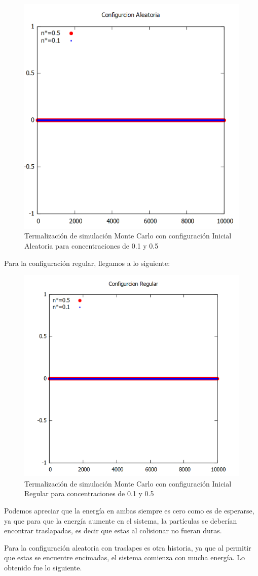 \documentclass[12pt,letterpaper]{article}
\begin{document}
\begin{figure}[H]
	\centering
	\includegraphics[width=0.5\linewidth]{aleatoria.png}
	\caption{Termalización  de simulación Monte Carlo con configuración Inicial Aleatoria para concentraciones de 0.1 y 0.5}
	\label{TermaAleatoria}
\end{figure}


Para la configuración regular, llegamos a lo siguiente:

\begin{figure}[H]
	\centering
	\includegraphics[width=0.5\linewidth]{regular.png}
	\caption{Termalización  de simulación Monte Carlo con configuración Inicial Regular para concentraciones de 0.1 y 0.5}
	\label{TermaReg}
\end{figure}


Podemos apreciar que la energía en ambas siempre es cero como es de esperarse, ya que para que la energía aumente en el sistema, la partículas  se deberían encontrar traslapadas, es decir que estas al colisionar no fueran duras.

Para la configuración aleatoria con traslapes es otra historia, ya que al permitir que estas se encuentre encimadas, el sistema comienza con mucha energía. Lo obtenido fue lo siguiente.
\end{document}
